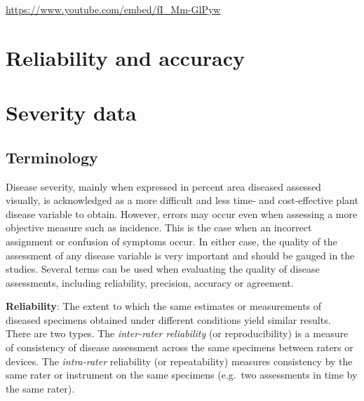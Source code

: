 \documentclass[
  letterpaper,
]{book}
\begin{document}
\url{https://www.youtube.com/embed/fI_Mm-GlPyw}

\hypertarget{reliability-and-accuracy}{%
\chapter{Reliability and accuracy}\label{reliability-and-accuracy}}

\hypertarget{severity-data}{%
\chapter{Severity data}\label{severity-data}}

\hypertarget{terminology}{%
\section{Terminology}\label{terminology}}

Disease severity, mainly when expressed in percent area diseased
assessed visually, is acknowledged as a more difficult and less time-
and cost-effective plant disease variable to obtain. However, errors may
occur even when assessing a more objective measure such as incidence.
This is the case when an incorrect assignment or confusion of symptoms
occur. In either case, the quality of the assessment of any disease
variable is very important and should be gauged in the studies. Several
terms can be used when evaluating the quality of disease assessments,
including reliability, precision, accuracy or agreement.

\textbf{Reliability}: The extent to which the same estimates or
measurements of diseased specimens obtained under different conditions
yield similar results. There are two types. The \emph{inter-rater
reliability} (or reproducibility) is a measure of consistency of disease
assessment across the same specimens between raters or devices. The
\emph{intra-rater} reliability (or repeatability) measures consistency
by the same rater or instrument on the same specimens (e.g.~two
assessments in time by the same rater).
\end{document}
